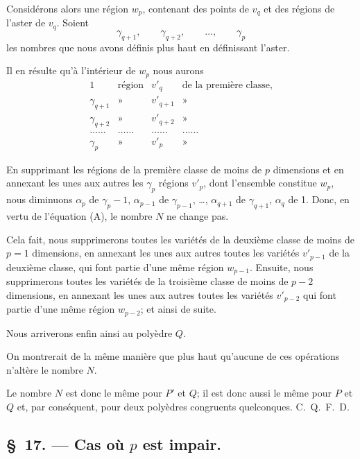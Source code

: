 \documentclass{article}
\begin{document}
Considérons alors une région $w_{p}$, contenant des points de $v_{q}$ et des régions de l'aster de $v_{q}$. Soient
\[ \gamma_{q+1}, \qquad \gamma_{q+2}, \qquad \ldots, \qquad \gamma_{p} \]
les nombres que nous avons définis plus haut en définissant l'aster.

Il en résulte qu'à l'intérieur de $w_{p}$ nous aurons
\[ \begin{matrix} 1 & \text{région} & v'_{q} & \text{de la première classe,} \\[1ex] \gamma_{q+1} & \text{»} & v'_{q+1} & \text{»} \\[1ex] \gamma_{q+2} & \text{»} & v'_{q+2} & \text{»} \\[1ex] \ldots\ldots & \ldots\ldots & \ldots\ldots & \ldots\ldots \\[1ex] \gamma_{p} & \text{»} & v'_{p} & \text{»} \end{matrix} \]

En supprimant les régions de la première classe de moins de $p$ dimensions et en annexant les unes aux autres les $\gamma_{p}$ régions $v'_{p}$, dont l'ensemble constitue $w_{p}$, nous diminuons $\alpha_{p}$ de $\gamma_{p} - 1$, $\alpha_{p-1}$ de $\gamma_{p-1}$, \ldots, $\alpha_{q+1}$ de $\gamma_{q+1}$, $\alpha_{q}$ de 1. Donc, en vertu de l'équation (A), le nombre $N$ ne change pas.

Cela fait, nous supprimerons toutes les variétés de la deuxième classe de moins de $p = 1$ dimensions, en annexant les unes aux autres toutes les variétés $v'_{p-1}$ de la deuxième classe, qui font partie d'une même région $w_{p-1}$. Ensuite, nous supprimerons toutes les variétés de la troisième classe de moins de $p - 2$ dimensions, en annexant les unes aux autres toutes les variétés $v'_{p-2}$ qui font partie d'une même région $w_{p-2}$; et ainsi de suite.

Nous arriverons enfin ainsi au polyèdre $Q$.

On montrerait de la même manière que plus haut qu'aucune de ces opérations n'altère le nombre $N$.

Le nombre $N$ est donc le même pour $P'$ et $Q$; il est donc aussi le même
pour $P$ et $Q$ et, par conséquent, pour deux polyèdres congruents quelconques. C.~Q.~F.~D.

\subsection*{\S~17. --- Cas où $p$ est impair.}
\end{document}
